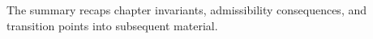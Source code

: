 The summary recaps chapter invariants, admissibility consequences, and transition points into subsequent material.
